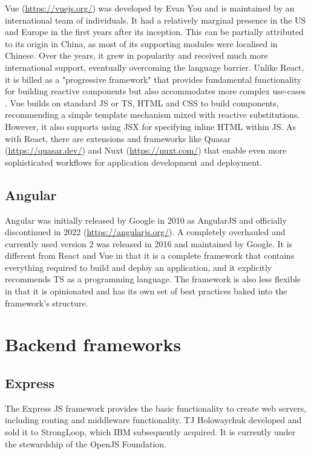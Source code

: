 Vue (\url{https://vuejs.org/}) was developed by Evan You and is maintained by an international team of individuals. It had a relatively marginal presence in the US and Europe in the first years after its inception. This can be partially attributed to its origin in China, as most of its supporting modules were localised in Chinese. Over the years, it grew in popularity and received much more international support, eventually overcoming the language barrier. Unlike React, it is billed as a "progressive framework" that provides fundamental functionality for building reactive components but also accommodates more complex use-cases \parencite{vueProgressiveFramework}. Vue builds on standard \ac{JS} or \ac{TS}, \ac{HTML} and \ac{CSS} to build components, recommending a simple template mechanism mixed with reactive substitutions. However, it also supports using \ac{JSX} for specifying inline \ac{HTML} within \ac{JS}. As with React, there are extensions and frameworks like Quasar (\url{https://quasar.dev/}) and Nuxt (\url{https://nuxt.com/}) that enable even more sophisticated workflows for application development and deployment.

\subsection{Angular}

Angular was initially released by Google in 2010 as AngularJS and officially discontinued in 2022 (\url{https://angularjs.org/}). A completely overhauled and currently used version 2 was released in 2016 and maintained by Google. It is different from React and Vue in that it is a complete framework that contains everything required to build and deploy an application, and it explicitly recommends \ac{TS} as a programming language. The framework is also less flexible in that it is opinionated and has its own set of best practices baked into the framework's structure.




\section{Backend frameworks}

\subsection{Express}

The Express JS framework provides the basic functionality to create web servers, including routing and middleware functionality. TJ Holowaychuk developed and sold it to StrongLoop, which IBM subsequently acquired. It is currently under the stewardship of the OpenJS Foundation.

